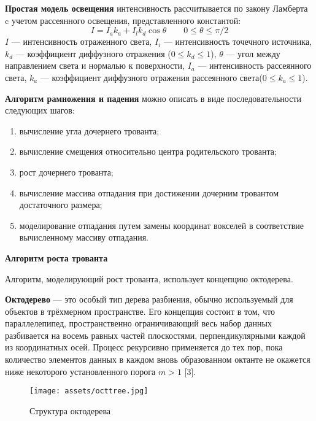 \textbf{Простая модель освещения} интенсивность рассчитывается по закону Ламберта c учетом рассеянного освещения, представленного константой:
\begin{equation}
I = I_{a}k_{a} + I_{l}k_{d}\cos \theta \qquad 0\leq\theta\leq\pi/2
\end{equation}
$I$ --- интенсивность отраженного света, $I_{i}$ --- интенсивность точечного источника, $k_{d}$ --- коэффициент диффузного отражения ($0\leq k_{d}\leq 1$), $\theta$ --- угол между направлением света и нормалью к поверхности, $I_{a}$ --- интенсивность рассеянного света, $k_{a}$ --- коэффициент диффузного отражения рассеянного света($0\leq k_{a}\leq 1$).

\textbf{Алгоритм рамножения и падения} можно описать в виде последовательности следующих шагов:
\begin{enumerate}
	\item вычисление угла дочернего трованта;
	\item вычисление смещения относительно центра родительского трованта;
	\item рост дочернего трованта;
	\item вычисление массива отпадания при достижении дочерним тровантом достаточного размера;
	\item моделирование отпадания путем замены координат вокселей в соответствие вычисленному массиву отпадания.
\end{enumerate}

\textbf{Алгоритм роста трованта}

Алгоритм, моделирующий рост трованта, использует концепцию октодерева.

\textbf{Октодерево} --- это особый тип дерева разбиения, обычно используемый для объектов в трёхмерном пространстве. Его концепция состоит в том, что параллелепипед, пространственно ограничивающий весь набор данных разбивается на восемь равных частей плоскостями, перпендикулярными каждой из координатных осей. Процесс рекурсивно применяется до тех пор, пока количество элементов данных в каждом вновь образованном октанте не окажется ниже некоторого установленного порога $m>1$ [3].

\newpage

\begin{figure}[h!]
	\begin{center}
		\texttt{[image: assets/octtree.jpg]}
	\end{center}
	\caption{Структура октодерева}
	\label{classes}
\end{figure}

